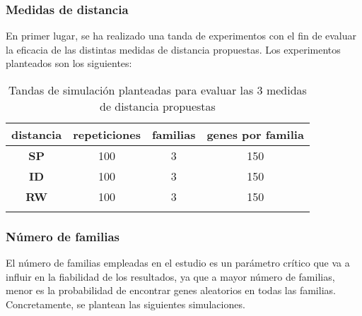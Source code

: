 \subsubsection{Medidas de distancia}
En primer lugar, se ha realizado una tanda de experimentos con el fin de evaluar la eficacia de las distintas medidas de distancia propuestas. Los experimentos planteados son los siguientes:
	
\bigskip
\begin{small}
\begin{center}
\begin{table}[H]
\begin{tabular}{cccc}
\textbf{distancia} & \textbf{repeticiones} & \textbf{familias} & \textbf{genes por familia}\tabularnewline 
\hline
\hline
\addlinespace[0.2cm]
\textbf{SP} & 100 & 3 & 150\tabularnewline
\textbf{ID} & 100 & 3 & 150\tabularnewline
\textbf{RW} & 100 & 3 & 150\tabularnewline
\addlinespace[0.2cm]
\hline
\end{tabular}
\caption{Tandas de simulación planteadas para evaluar las 3 medidas de distancia propuestas}
\label{tab:tabla_distancias}
\end{table}

\end{center}
\end{small}
\medskip

\subsubsection{Número de familias}
El número de familias empleadas en el estudio es un parámetro crítico que va a influir en la fiabilidad de los resultados, ya que a mayor número de familias, menor es la probabilidad de encontrar genes aleatorios en todas las familias. Concretamente, se plantean las siguientes simulaciones.

